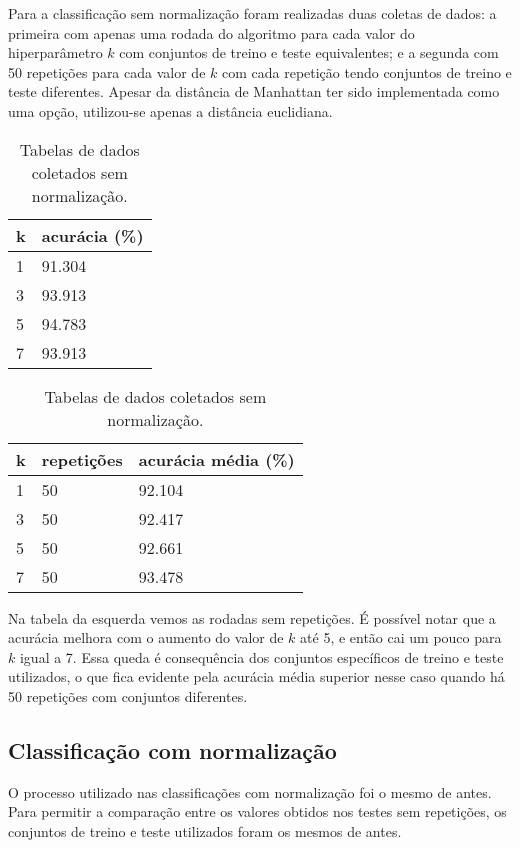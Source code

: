 \documentclass{article}
\begin{document}
Para a classificação sem normalização foram realizadas duas coletas de dados: a primeira com apenas uma rodada do algoritmo para cada valor do hiperparâmetro \(k\) com conjuntos de treino e teste equivalentes; e a segunda com 50 repetições para cada valor de \(k\) com cada repetição tendo conjuntos de treino e teste diferentes. Apesar da distância de Manhattan ter sido implementada como uma opção, utilizou-se apenas a distância euclidiana.

\bigskip
\begin{table}[h]
\begin{center}
    \begin{tabular}{ | m{2em} | m{10em} | }
    \hline
    k & acurácia (\%) \\
    \hline
    1 & 91.304 \\
    3 & 93.913 \\
    5 & 94.783 \\
    7 & 93.913 \\
    \hline
    \end{tabular}
    \hspace{20pt}%
    \begin{tabular}{ | m{2em} | m{5em} | m{10em} | }
    \hline
    k & repetições & acurácia média (\%) \\
    \hline
    1 & 50 & 92.104 \\
    3 & 50 & 92.417 \\
    5 & 50 & 92.661 \\
    7 & 50 & 93.478 \\
    \hline
    \end{tabular}
\caption{Tabelas de dados coletados sem normalização.}
\end{center}
\end{table}

Na tabela da esquerda vemos as rodadas sem repetições. É possível notar que a acurácia melhora com o aumento do valor de \(k\) até 5, e então cai um pouco para \(k\) igual a 7. Essa queda é consequência dos conjuntos específicos de treino e teste utilizados, o que fica evidente pela acurácia média superior nesse caso quando há 50 repetições com conjuntos diferentes.

\subsection*{Classificação com normalização}

O processo utilizado nas classificações com normalização foi o mesmo de antes. Para permitir a comparação entre os valores obtidos nos testes sem repetições, os conjuntos de treino e teste utilizados foram os mesmos de antes.
\end{document}
